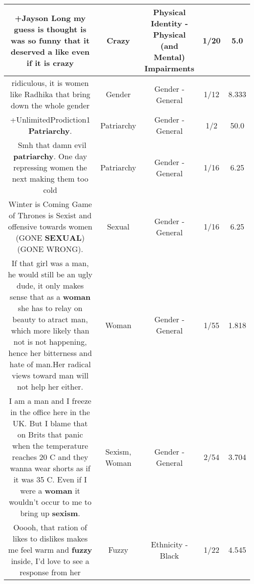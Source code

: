 \documentclass[11pt]{article}
\newlength\mylength
\begin{document}
\begin{center}
\begin{longtable}{|C{.65\mylength}|C{.30\mylength}|C{.12\mylength}|C{.12\mylength}|C{.12\mylength}|}
  \small +Jayson Long my guess is thought is was so funny that it deserved a like even if it is crazy\normalsize   & Crazy & Physical Identity - Physical (and Mental) Impairments & 1/20 & 5.0 \\  \hline
  \small ridiculous, it is women like Radhika that bring down the whole gender\normalsize   & Gender & Gender - General & 1/12 & 8.333 \\  \hline
  \small +UnlimitedProdiction1 \textbf{Patriarchy}.\normalsize   & Patriarchy & Gender - General & 1/2 & 50.0 \\  \hline
  \small {} Smh that damn evil \textbf{patriarchy}. One day repressing women the next making them too cold\normalsize   & Patriarchy & Gender - General & 1/16 & 6.25 \\  \hline
  \small Winter is Coming Game of Thrones is Sexist and offensive towards women (GONE \textbf{SEXUAL}) (GONE WRONG).\normalsize   & Sexual & Gender - General & 1/16 & 6.25 \\  \hline
  \small If that girl was a man, he would still be an ugly dude, it only makes sense that as a \textbf{woman} she has to relay on beauty to atract man, which more likely than not is not happening, hence her bitterness and hate of man.Her radical views toward man will not help her either.\normalsize   & Woman & Gender - General & 1/55 & 1.818 \\  \hline
  \small I am a man and I freeze in the office here in the UK. But I blame that on Brits that panic when the temperature reaches 20 C and they wanna wear shorts as if it was 35 C. Even if I were a \textbf{woman} it wouldn't occur to me to bring up \textbf{sexism}.\normalsize   & Sexism, Woman & Gender - General & 2/54 & 3.704 \\  \hline
  \small Ooooh, that ration of likes to dislikes makes me feel warm and \textbf{fuzzy} inside, I'd love to see a response from her\normalsize   & Fuzzy & Ethnicity - Black & 1/22 & 4.545 \\  \hline

\end{longtable}
\end{center}
\end{document}
